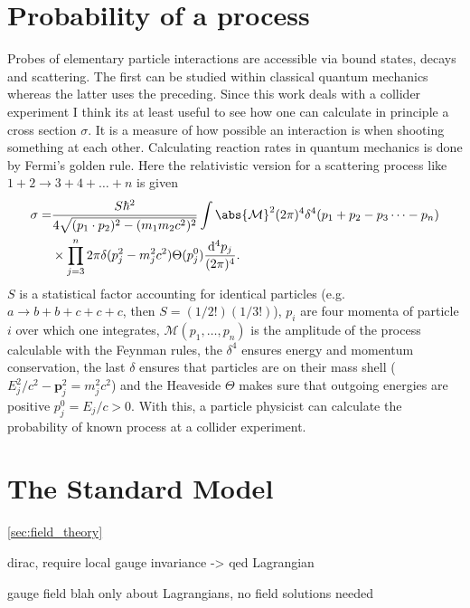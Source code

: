 \section{Probability of a process}
Probes of elementary particle interactions are accessible via bound states, decays and scattering. The first can be studied within classical quantum mechanics whereas the latter uses the preceding. Since this work deals with a collider experiment I think its at least useful to see how one can calculate in principle a cross section $\sigma$. It is a measure of how possible an interaction is when shooting something at each other. Calculating reaction rates in quantum mechanics is done by Fermi's golden rule. Here the relativistic version for a scattering process like $1+2 \rightarrow 3+4+\dots+n$ is given \citep{griffiths2020introduction}
\begin{align}
    \begin{split}
        \sigma=&\frac{S\hbar^2}{4\sqrt{(p_1\cdot p_2)^2 - (m_1m_2c^2)^2}}\int \abs{\mathcal{M}}^2(2\pi)^4\delta^4(p_1+p_2-p_3 \dots-p_n) \\
        &\times \prod_{j=3}^n 2\pi \delta(p_j^2-m_j^2c^2)\Theta(p_j^0)\frac{\mathrm
        d^4p_j}{(2\pi)^4}.
    \end{split}
\end{align}
$S$ is a statistical factor accounting for identical particles (e.g. $a\rightarrow b+b+c+c+c$, then $S=(1/2!)(1/3!)$), $p_i$ are four momenta of particle $i$ over which one integrates, $\mathcal{M}(p_1,\dots,p_n)$ is the amplitude of the process calculable with the Feynman rules, the $\delta^4$ ensures energy and momentum conservation, the last $\delta$ ensures that particles are on their mass shell ($E_j^2/c^2-\bm{p}_j^2=m_j^2c^2$) and the Heaveside $\Theta$ makes sure that outgoing energies are positive $p_j^0=E_j/c>0$. With this, a particle physicist can calculate the probability of known process at a collider experiment.

\section{The Standard Model}
\ref{sec:field_theory}

dirac, require local gauge invariance -> qed Lagrangian


gauge field blah only about Lagrangians, no field solutions needed